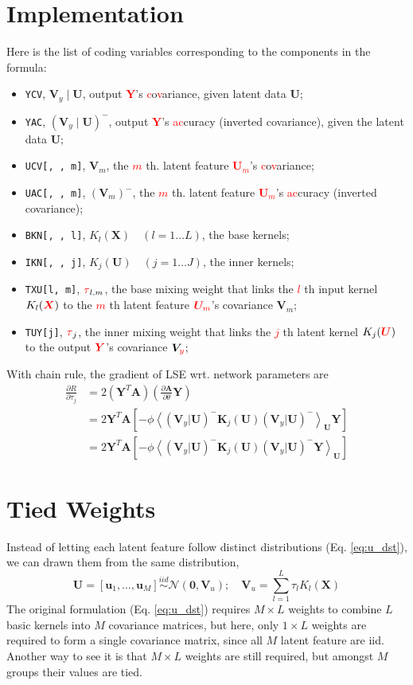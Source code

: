 \documentclass[11pt]{article}
\newcommand{\bs}{\boldsymbol}
\newcommand{\mean}[2]{\left\langle{#1}\right\rangle_{#2}}
\newcommand{\vu}{\boldsymbol{u}}
\newcommand{\xv}{\boldsymbol{V}}
\newcommand{\xk}{\boldsymbol{K}}
\newcommand{\xx}{\boldsymbol{X}}
\newcommand{\xu}{\boldsymbol{U}}
\newcommand{\xy}{\boldsymbol{Y}}
\newcommand{\xa}{\boldsymbol{A}}
\newcommand{\PDV}[2]{\frac{\partial #1}{\partial #2}}
\begin{document}
\section{Implementation}
Here is the list of coding variables corresponding to the components in the formula:
\newcommand{\red}[1]{\textcolor{red}{#1}}
\begin{itemize}
\item \texttt{YCV}, $\xv_y \mid \xu$, output \red{$\xy$}'s \red{c}o\red{v}ariance, given latent data $\xu$;
\item \texttt{YAC}, $(\xv_y \mid \xu)^-$, output \red{$\xy$}'s \red{ac}curacy (inverted covariance), given the latent data $\xu$;
\item \texttt{UCV[, , m]}, $\xv_m$, the \red{$m$} th. latent feature \red{$\xu_m$}'s \red{c}o\red{v}ariance;
\item \texttt{UAC[, , m]}, $(\xv_m)^-$, the \red{$m$} th. latent feature \red{$\xu_m$}'s \red{ac}curacy (inverted covariance);
\item \texttt{BKN[, , l]}, $K_l(\xx)\quad (l = 1 \dots L)$, the base kernels;
\item \texttt{IKN[, , j]}, $K_j(\xu)\quad (j = 1 \dots J)$, the inner kernels;
\item \texttt{TXU[l, m]}, $\red{\tau}_{l,m}$, the base mixing weight that links the \red{$l$} th input kernel $K_l(\red{\xx})$ to the \red{$m$} th latent feature $\red{\xu_m}$'s covariance $\xv_m$;
\item \texttt{TUY[j]}, $\red{\tau}_j$, the inner mixing weight that links the \red{$j$} th latent kernel $K_j(\red{\xu})$ to the output $\red{\xy}$'s covariance $\xv_{\red{y}}$;
\end{itemize}
With chain rule, the gradient of LSE wrt. network parameters are
\begin{align*}
  \PDV{R}{\tau_j}   & = 2 (\xy^T\xa) (\PDV{\xa}{\theta} \xy) \\
                    & = 2 \xy^T \xa [-\phi\mean{(\xv_y|\xu)^- \xk_j(\xu) (\xv_y|\xu)^-}{\xu} \xy] \\
                    & = 2 \xy^T \xa [-\phi\mean{(\xv_y|\xu)^- \xk_j(\xu) (\xv_y|\xu)^- \xy}{\xu}]
\end{align*}

\section{Tied Weights}
Instead of letting each latent feature follow distinct distributions (Eq. \ref{eq:u_dst}), we can drawn them from the same distribution,
\begin{equation}\label{eq:tie_u_dst}
  \xu = \left[\vu_1, \dots, \vu_M \right] \overset{iid}{\sim} \mathcal{N}\left(\bs{0}, \xv_u \right); \quad \xv_u = \sum_{l=1}^L \tau_l K_l(\xx)
\end{equation}
The original formulation (Eq. \ref{eq:u_dst}) requires $M \times L$ weights to combine $L$ basic kernels into $M$ covariance matrices, but here, only $1 \times L$ weights are required to form a single covariance matrix, since all $M$ latent feature are iid. Another way to see it is that $M \times L$ weights are still required, but amongst $M$ groups their values are tied.
\end{document}
